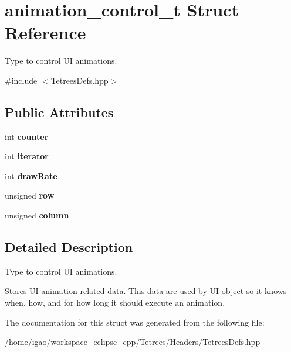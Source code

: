 \hypertarget{structanimation__control__t}{}\section{animation\+\_\+control\+\_\+t Struct Reference}
\label{structanimation__control__t}


Type to control UI animations.  




{\ttfamily \#include $<$Tetrees\+Defs.\+hpp$>$}

\subsection*{Public Attributes}
\begin{DoxyCompactItemize}
\item 
\mbox{\label{structanimation__control__t_a73ff393fa08828b3f7a20e7211cad769}} 
int {\bfseries counter}
\item 
\mbox{\label{structanimation__control__t_aef39107b1215226cb22a90eac0193b0d}} 
int {\bfseries iterator}
\item 
\mbox{\label{structanimation__control__t_a1b2d2b9a6c4a602c8f060a93b1adc072}} 
int {\bfseries draw\+Rate}
\item 
\mbox{\label{structanimation__control__t_a8ad7abe75413335a1e7984559ef2a32b}} 
unsigned {\bfseries row}
\item 
\mbox{\label{structanimation__control__t_a311b7da11edaaadae48b595082d3830f}} 
unsigned {\bfseries column}
\end{DoxyCompactItemize}


\subsection{Detailed Description}
Type to control UI animations. 

Stores UI animation related data. This data are used by \hyperlink{classTetreesEngine_a01bf1d438236d5f57129ffb22adf59ce}{UI object} so it knows when, how, and for how long it should execute an animation. 

The documentation for this struct was generated from the following file\+:\begin{DoxyCompactItemize}
\item 
/home/igao/workspace\+\_\+eclipse\+\_\+cpp/\+Tetrees/\+Headers/\hyperlink{TetreesDefs_8hpp}{Tetrees\+Defs.\+hpp}\end{DoxyCompactItemize}
